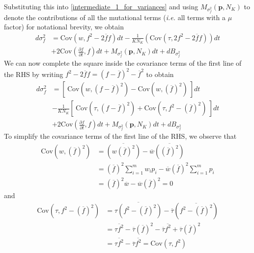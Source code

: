 Substituting this into \eqref{intermediate_1_for_variances} and using $M_{\sigma^2_f}(\mathbf{p},N_K)$ to denote the contributions of all the mutational terms (\emph{i.e.} all terms with a $\mu$ factor) for notational brevity, we obtain
\begin{equation}
\begin{aligned}
d\sigma^2_{f} &= \textrm{Cov}(w,f^2 - 2\overline{f}f)dt - \frac{1}{KN_K}\left(\textrm{Cov}(\tau,2f^2 - 2\overline{f}f)\right)dt\\
&+ 2\textrm{Cov}\left(\frac{\partial f}{\partial t},f\right)dt + M_{\sigma^2_f}(\mathbf{p},N_K)dt + dB_{\sigma^2_{f}}
\end{aligned}
\end{equation}
We can now complete the square inside the covariance terms of the first line of the RHS by writing $f^2 - 2\overline{f}f = (f - \overline{f})^2 - \overline{f}^2$ to obtain
\begin{equation}
\label{intermediate_2_for_variances}
\begin{aligned}
d\sigma^2_{f} &= \left[ \ \textrm{Cov}\left(w,(f - \overline{f})^2\right)-\textrm{Cov}\left(w, {\left(\overline{f}\right)}^2\right) \ \right]dt\\[12pt]
&- \frac{1}{KN_K}\left[ \ \textrm{Cov}\left(\tau,(f - \overline{f})^2\right) + \textrm{Cov}\left(\tau,f^2 - {\left(\overline{f}\right)}^2\right) \ \right]dt\\[12pt]
& + 2\textrm{Cov}\left(\frac{\partial f}{\partial t},f\right)dt + M_{\sigma^2_f}(\mathbf{p},N_K)dt + dB_{\sigma^2_{f}}
\end{aligned}
\end{equation}
To simplify the covariance terms of the first line of the RHS, we observe that
\begin{align}
\textrm{Cov}\left(w, {\left(\overline{f}\right)}^2\right) &= \overline{\left(w{\left(\overline{f}\right)}^2\right)} - \overline{w}\overline{\left({\left(\overline{f}\right)}^2\right)}\nonumber\\
&= {\left(\overline{f}\right)}^2\sum\limits_{i=1}^{m}w_ip_i - \overline{w}{\left(\overline{f}\right)}^2\sum\limits_{i=1}^{m}p_i\nonumber\\
&= {\left(\overline{f}\right)}^2\overline{w} - \overline{w}{\left(\overline{f}\right)}^2 = 0\label{cov_term_1_for_variances}
\end{align}
and
\begin{align}
\textrm{Cov}\left(\tau,f^2 - {\left(\overline{f}\right)}^2\right) &= \overline{\tau\left(f^2 - {\left(\overline{f}\right)}^2\right)} - \overline{\tau}\left(\overline{f^2 - {\left(\overline{f}\right)}^2}\right)\nonumber\\
&= \overline{\tau f^2} - \overline{\tau}{\left(\overline{f}\right)}^2  - \overline{\tau}\overline{f^2} + \overline{\tau}{\left(\overline{f}\right)}^2\nonumber\\
&=\overline{\tau f^2} - \overline{\tau}\overline{f^2} = \textrm{Cov}(\tau,f^2)\label{cov_term_2_for_variances}
\end{align}

